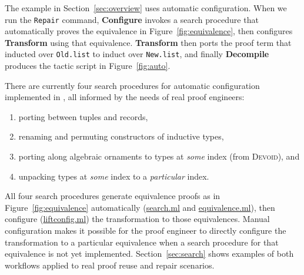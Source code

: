 The example in Section~\ref{sec:overview} uses automatic configuration. When we run the \lstinline{Repair} command,
\textbf{Configure} invokes a search procedure that automatically proves the equivalence in Figure~\ref{fig:equivalence},
then configures \textbf{Transform} using that equivalence.
\textbf{Transform} then ports the proof term that inducted over \lstinline{Old.list}
to induct over \lstinline{New.list}, and finally
\textbf{Decompile} produces the tactic script in Figure~\ref{fig:auto}.

There are currently four search procedures for automatic configuration implemented in \toolname,
all informed by the needs of real proof engineers:

\begin{enumerate}
\item porting between tuples and records,
\item renaming and permuting constructors of inductive types,
\item porting along algebraic ornaments to types at \textit{some} index (from \textsc{Devoid}), and
\item unpacking types at \textit{some} index to a \textit{particular} index.
\end{enumerate}
All four search procedures generate equivalence proofs as in Figure~\ref{fig:equivalence} automatically (\href{https://github.com/uwplse/pumpkin-pi/blob/master/plugin/src/automation/search/search.ml}{search.ml} and \href{https://github.com/uwplse/pumpkin-pi/blob/master/plugin/src/automation/search/equivalence.ml}{equivalence.ml}),
then configure (\href{https://github.com/uwplse/pumpkin-pi/blob/master/plugin/src/automation/lift/liftconfig.ml}{liftconfig.ml}) the transformation to those equivalences.
Manual configuration makes it possible
for the proof engineer to directly configure the transformation to a particular equivalence
when a search procedure for that equivalence is not yet implemented.
Section~\ref{sec:search} shows examples of both workflows applied to real proof reuse and repair scenarios.




